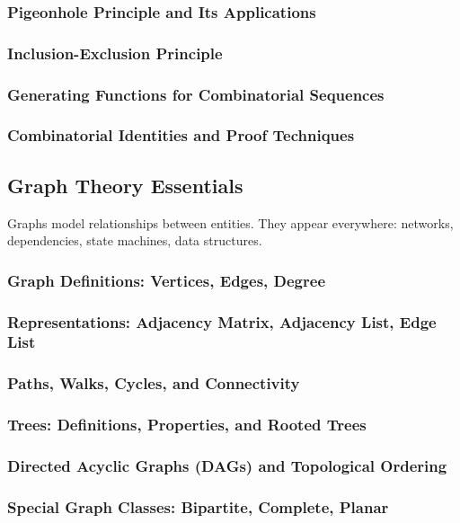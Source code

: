 \subsubsection{Pigeonhole Principle and Its Applications}
\subsubsection{Inclusion-Exclusion Principle}
\subsubsection{Generating Functions for Combinatorial Sequences}
\subsubsection{Combinatorial Identities and Proof Techniques}

\subsection{Graph Theory Essentials}
\label{subsec:graph-theory}

\begin{subsectionintro}
Graphs model relationships between entities. They appear everywhere:
networks, dependencies, state machines, data structures.
\end{subsectionintro}

\subsubsection{Graph Definitions: Vertices, Edges, Degree}
\subsubsection{Representations: Adjacency Matrix, Adjacency List, Edge List}
\subsubsection{Paths, Walks, Cycles, and Connectivity}
\subsubsection{Trees: Definitions, Properties, and Rooted Trees}
\subsubsection{Directed Acyclic Graphs (DAGs) and Topological Ordering}
\subsubsection{Special Graph Classes: Bipartite, Complete, Planar}
